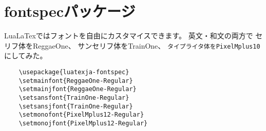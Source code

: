 \section{fontspecパッケージ}

LuaLaTexではフォントを自由にカスタマイスできます。
英文・和文の両方で
\textrm{セリフ体をReggaeOne}、
\textsf{サンセリフ体をTrainOne}、
\texttt{タイプライタ体をPixelMplus10}
にしてみた。

\begin{verbatim}
    \usepackage{luatexja-fontspec}
    \setmainfont{ReggaeOne-Regular}
    \setmainjfont{ReggaeOne-Regular}
    \setsansfont{TrainOne-Regular}
    \setsansjfont{TrainOne-Regular}
    \setmonofont{PixelMplus12-Regular}
    \setmonojfont{PixelMplus12-Regular}
\end{verbatim}
